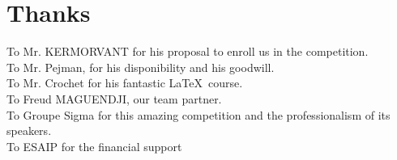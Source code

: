 \section*{Thanks}
\thispagestyle{empty}
To Mr. KERMORVANT for his proposal to enroll us in the competition.\\

To Mr. Pejman, for his disponibility and his goodwill.\\

To Mr. Crochet for his fantastic \LaTeX~course.\\

To Freud MAGUENDJI, our team partner.\\

To Groupe Sigma for this amazing competition and the professionalism of its speakers.\\

To ESAIP for the financial support\\
\newpage